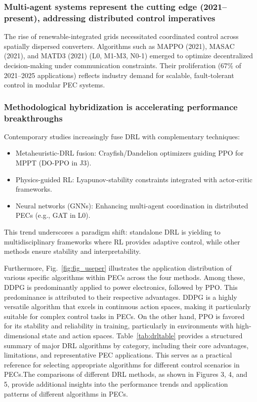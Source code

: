 \subsubsection{Multi-agent systems represent the cutting edge (2021–present), addressing distributed control imperatives} The rise of renewable-integrated grids necessitated coordinated control across spatially dispersed converters. Algorithms such as MAPPO (2021), MASAC (2021), and MATD3 (2021) (L0, M1-M3, N0-1) emerged to optimize decentralized decision-making under communication constraints. Their proliferation (67\% of 2021–2025 applications) reflects industry demand for scalable, fault-tolerant control in modular PEC systems. 

\subsubsection{Methodological hybridization is accelerating performance breakthroughs} Contemporary studies increasingly fuse DRL with complementary techniques:
\begin{itemize}

  \item[$\bullet$] Metaheuristic-DRL fusion: Crayfish/Dandelion optimizers guiding PPO for MPPT (DO-PPO in J3).

  \item[$\bullet$] Physics-guided RL: Lyapunov-stability constraints integrated with actor-critic frameworks.

  \item[$\bullet$] Neural networks (GNNs): Enhancing multi-agent coordination in distributed PECs (e.g., GAT in L0).

\end{itemize}

This trend underscores a paradigm shift: standalone DRL is yielding to multidisciplinary frameworks where RL provides adaptive control, while other methods ensure stability and interpretability.

Furthermore, Fig.~\ref{fig:fig_useper} illustrates the application distribution of various specific algorithms within PECs across the four methods. Among these, DDPG is predominantly applied to power electronics, followed by PPO. This predominance is attributed to their respective advantages. DDPG is a highly versatile algorithm that excels in continuous action spaces, making it particularly suitable for complex control tasks in PECs. On the other hand, PPO is favored for its stability and reliability in training, particularly in environments with high-dimensional state and action spaces. Table~\ref{tab:drltable} provides a structured summary of major DRL algorithms by category, including their core advantages, limitations, and representative PEC applications. This serves as a practical reference for selecting appropriate algorithms for different control scenarios in PECs.The comparisons of different DRL methods, as shown in Figures 3, 4, and 5, provide additional insights into the performance trends and application patterns of different algorithms in PECs.

